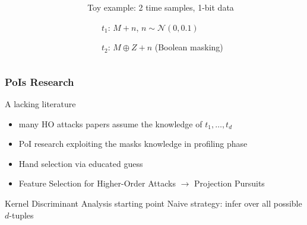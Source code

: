\begin{frame}
{\begin{columns}
\begin{column}{.5\textwidth}
\end{column}
\begin{column}{.5\textwidth}
\begin{block}{}
Toy example: 2 time samples, 1-bit data
\begin{itemize}
\item[$t_1$:] $M + n$, $n\sim \mathcal{N}(0,0.1)$ 
\item[$t_2$:] $M\oplus Z + n$ (Boolean masking)
\end{itemize}
\end{block}
\end{column}
\end{columns}
}

\end{frame}



%

\begin{frame}
\frametitle{PoIs Research}

\begin{block}{A lacking literature}
\begin{itemize}
\item many HO attacks papers assume the knowledge of $t_1,\dots, t_d$
\item PoI research exploiting the masks knowledge in profiling phase
\item Hand selection via educated guess \textcolor{cyan}{\cite{Oswald2006}}
\item Feature Selection for Higher-Order Attacks $\longrightarrow$ Projection Pursuits \textcolor{cyan}{\cite{PP}}
\end{itemize}
\end{block}

\begin{block}{Kernel Discriminant Analysis starting point}
Naive strategy: infer over all possible $d$-tuples 
\end{block}
\end{frame}

